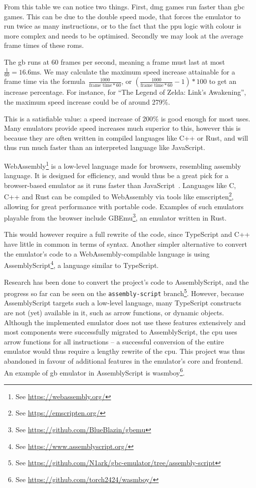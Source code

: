\documentclass[11pt]{informatics-report}
\newcommand{\ftnt}[1]{\footnote{See \url{#1}}}
\begin{document}
From this table we can notice two things. First, \gls{dmg} games run faster than \gls{gbc} games. This can be due to the double speed mode, that forces the emulator to run twice as many instructions, or to the fact that the \gls{ppu} logic with colour is more complex and needs to be optimised. Secondly we may look at the average frame times of these \glspl{rom}.

The \gls{gb} runs at 60 frames per second, meaning a frame must last at most $\frac{1}{60}=16.6\text{ms}$. We may calculate the maximum speed increase attainable for a frame time via the formula~$\frac{1000}{\text{frame time} * 60}$, or $(\frac{1000}{\text{frame time} * 60}-1)*100$ to get an increase percentage. For instance, for ``The Legend of Zelda: Link's Awakening'', the maximum speed increase could be of around 279\%.

This is a satisfiable value: a speed increase of 200\% is good enough for most uses. Many emulators provide speed increases much superior to this, however this is because they are often written in compiled languages like C++ or Rust, and will thus run much faster than an interpreted language like JavaScript.

WebAssembly\ftnt{https://webassembly.org/} is a low-level language made for browsers, resembling assembly language. It is designed for efficiency, and would thus be a great pick for a browser-based emulator as it runs faster than JavaScript~\cite{wasm-faster}. Languages like C, C++ and Rust can be compiled to WebAssembly via tools like emscripten\ftnt{https://emscripten.org/}, allowing for great performance with portable code. Examples of such emulators playable from the browser include GBEmu\ftnt{https://github.com/BlueBlazin/gbemu}, an emulator written in Rust.


This would however require a full rewrite of the code, since TypeScript and C++ have little in common in terms of syntax. Another simpler alternative to convert the emulator's code to a WebAssembly-compilable language is using AssemblyScript\ftnt{https://www.assemblyscript.org/}, a language similar to TypeScript.

Research has been done to convert the project's code to AssemblyScript, and the progress so far can be seen on the \texttt{assembly-script} branch\ftnt{https://github.com/N1ark/gbc-emulator/tree/assembly-script}. However, because AssemblyScript targets such a low-level language, many TypeScript constructs are not (yet) available in it, such as arrow functions, or dynamic objects. Although the implemented emulator does not use these features extensively and most components were successfully migrated to AssemblyScript, the \gls{cpu} uses arrow functions for all instructions -- a successful conversion of the entire emulator would thus require a lengthy rewrite of the \gls{cpu}. This project was thus abandoned in favour of additional features in the emulator's core and frontend. An example of \gls{gb} emulator in AssemblyScript is wasmboy\ftnt{https://github.com/torch2424/wasmboy/}.
\end{document}
